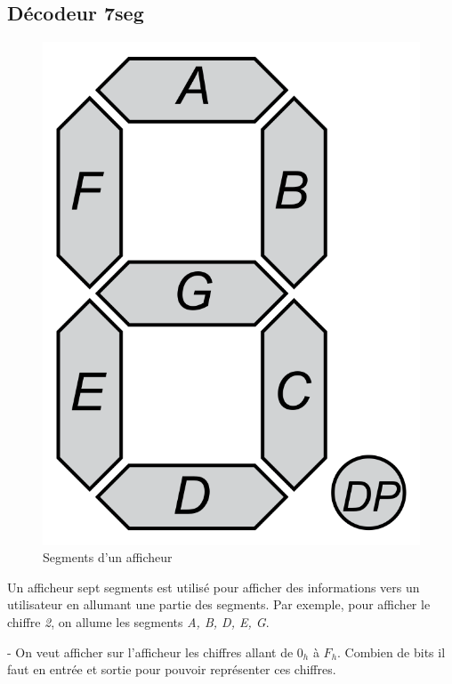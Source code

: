 \newpage

\subsection{Décodeur 7seg}

\begin{figure}[ht]
    \centering
    \includegraphics[scale = 0.1]{img/SevenSegDisplay.png}
    \caption{Segments d'un afficheur}
\end{figure}

Un afficheur sept segments est utilisé pour afficher des informations vers un utilisateur en allumant une partie des segments. Par exemple, pour afficher le chiffre \textit{2}, on allume les segments \textit{A, B, D, E, G}.

\medskip

- On veut afficher sur l'afficheur les chiffres allant de $0_h$ à $F_h$. Combien de bits il faut en entrée et sortie pour pouvoir représenter ces chiffres.

